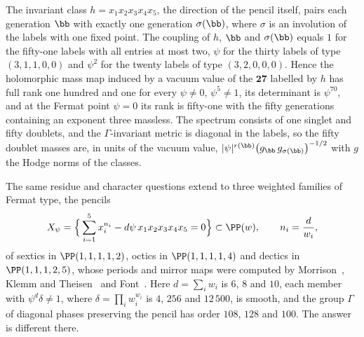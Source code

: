 \begin{theorem}\label{thm:C}
The invariant class $h=x_1x_2x_3x_4x_5$, the direction of the pencil
itself, pairs each generation $\bb$ with exactly one generation
$\sigma(\bb)$, where $\sigma$ is an involution of the labels with one fixed
point. The coupling of $h$, $\bb$ and $\sigma(\bb)$ equals $1$ for the
fifty-one labels with all entries at most two, $\psi$ for the thirty labels
of type $(3,1,1,0,0)$ and $\psi^2$ for the twenty labels of type
$(3,2,0,0,0)$. Hence the holomorphic mass map induced by a vacuum value of the
$\mathbf{27}$ labelled by $h$ has full rank one hundred and one for every
$\psi\ne0$, $\psi^5\ne1$, its determinant is $\psi^{70}$, and at the
Fermat point $\psi=0$ its rank is fifty-one with the fifty generations
containing an exponent three massless. The spectrum consists of one singlet
and fifty doublets, and the $\Gamma$-invariant metric is diagonal in the
labels, so the fifty doublet masses are, in units of the vacuum value,
$|\psi|^{r(\bb)}\big(g_{\bb}\,g_{\sigma(\bb)}\big)^{-1/2}$ with $g$ the
Hodge norms of the classes.
\end{theorem}



The same residue and character questions extend to three weighted families
of Fermat type, the pencils
\begin{equation}\label{eq:wpencil}
X_\psi=\Big\{\sum_{i=1}^5x_i^{n_i}-d\psi\,x_1x_2x_3x_4x_5=0\Big\}
\subset\PP(w),\qquad n_i=\frac{d}{w_i},
\end{equation}
of sextics in $\PP(1,1,1,1,2)$, octics in $\PP(1,1,1,1,4)$ and dectics in
$\PP(1,1,1,2,5)$, whose periods and mirror maps were computed by
Morrison~\cite{Mor92}, Klemm and Theisen~\cite{KT93} and
Font~\cite{Fon93}. Here $d=\sum_iw_i$ is $6$, $8$ and $10$, each member
with $\psi^d\delta\ne1$, where $\delta=\prod_iw_i^{w_i}$ is $4$, $256$ and
$12\,500$, is smooth, and the group $\Gamma$ of diagonal phases preserving
the pencil has order $108$, $128$ and $100$. The answer is different there.

